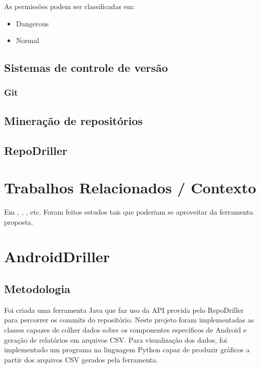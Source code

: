 \documentclass[a4paper,12pt]{article}
\numberwithin{figure}{section}
\begin{document}
As permissões podem ser classificadas em: 
\begin{itemize}
	\item {Dangerous}
	\item {Normal}
\end{itemize}


\subsection{Sistemas de controle de versão}%
\subsubsection{Git}%
\subsection{Mineração de repositórios}%
\subsection{RepoDriller}%
\cite{repodriller}

\newpage
\section{Trabalhos Relacionados / Contexto}%
Em \cite{Calciati}, \cite{WhoAdded}, \cite{YLyu}, etc. Foram feitos estudos tais que poderiam se aproveitar da ferramenta proposta.




\newpage
\section{AndroidDriller}%

\subsection{Metodologia}

Foi criada uma ferramenta Java que faz uso da API provida pelo RepoDriller para
percorrer os commits do repositório. Neste projeto foram implementadas as
classes capazes de colher dados sobre os componentes específicos de Android e
geração de relatórios em arquivos CSV. Para visualização dos dados, foi
implementado um programa na linguagem Python capaz de produzir gráficos a
partir dos arquivos CSV gerados pela ferramenta.\\
\end{document}
